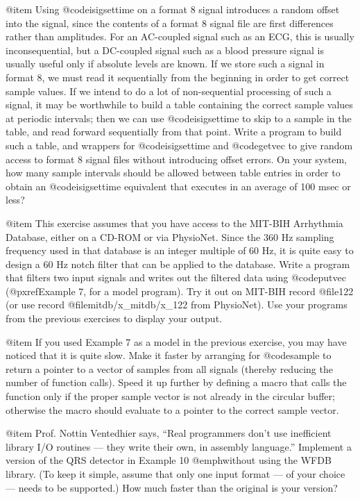 {{{{{{{{{@item
Using @code{isigsettime} on a format 8 signal introduces a random offset
into the signal, since the contents of a format 8 signal file are first
differences rather than amplitudes.  For an AC-coupled signal such as an
ECG, this is usually inconsequential, but a DC-coupled signal such as a
blood pressure signal is usually useful only if absolute levels are
known.  If we store such a signal in format 8, we must read it
sequentially from the beginning in order to get correct sample values.
If we intend to do a lot of non-sequential processing of such a signal,
it may be worthwhile to build a table containing the correct sample
values at periodic intervals; then we can use @code{isigsettime} to
skip to a sample in the table, and read forward sequentially from that
point.  Write a program to build such a table, and wrappers for
@code{isigsettime} and @code{getvec} to give random access to format 8
signal files without introducing offset errors.  On your system, how
many sample intervals should be allowed between table entries in order
to obtain an @code{isigsettime} equivalent that executes in an average
of 100 msec or less?

@item
This exercise assumes that you have access to the MIT-BIH Arrhythmia
Database, either on a CD-ROM or via PhysioNet.  Since the 360 Hz sampling
frequency used in that database is an integer multiple of 60 Hz, it is
quite easy to design a 60 Hz notch filter that can be applied to the
database.  Write a program that filters two input signals and writes
out the filtered data using @code{putvec} (@pxref{Example 7}, for a
model program).  Try it out on MIT-BIH record @file{122} (or use record
@file{mitdb/x_mitdb/x_122} from PhysioNet).  Use your programs from
the previous exercises to display your output.

@item
If you used Example 7 as a model in the previous exercise, you may have
noticed that it is quite slow.  Make it faster by arranging for
@code{sample} to return a pointer to a vector of samples from all
signals (thereby reducing the number of function calls).  Speed it up
further by defining a macro that calls the function only if the proper
sample vector is not already in the circular buffer; otherwise the macro
should evaluate to a pointer to the correct sample vector.

@item
Prof. Nottin Ventedhier says, ``Real programmers don't use inefficient
library I/O routines --- they write their own, in assembly language.''
Implement a version of the QRS detector in Example 10 @emph{without}
using the WFDB library.  (To keep it simple, assume that only one input
format --- of your choice --- needs to be supported.)  How much faster
than the original is your version?

}}}}}}}}}
